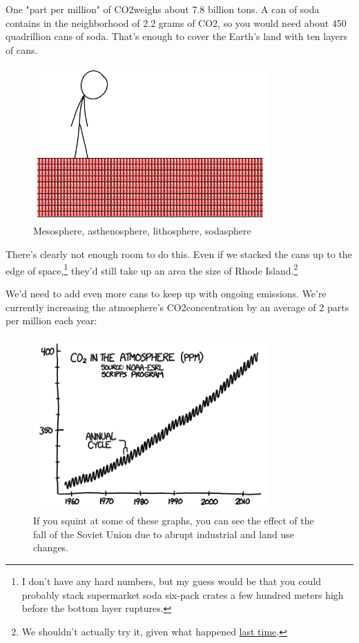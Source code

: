 {{One "part per million" of CO2weighs about 7.8 billion tons. A can of soda contains in the neighborhood of 2.2 grams of CO2, so you would need about 450 quadrillion cans of soda. That's enough to cover the Earth's land with ten layers of cans.}

\begin{figure}[!htbp]
\centering
\includegraphics[scale=0.5, max width=0.8\textwidth]{imgs/a/88/soda_layers.png}
\caption{Mesosphere, asthenosphere, lithosphere, sodasphere}
\end{figure}

{There's clearly not enough room to do this. Even if we stacked the cans up to the edge of space,{\footnote{I don't have any hard numbers, but my guess would be that you could probably stack supermarket soda six-pack crates a few hundred meters high before the bottom layer ruptures.} } they'd still take up an area the size of Rhode Island.{\footnote{We shouldn't actually try it, given what happened \href{http://what-if.xkcd.com/8/}{last time}.} } }

{We'd need to add even more cans to keep up with ongoing emissions. We're currently increasing the atmosphere's CO2concentration by an average of 2 parts per million each year:}

\begin{figure}[!htbp]
\centering
\includegraphics[scale=0.5, max width=0.8\textwidth]{imgs/a/88/soda_graph.png}
\caption{If you squint at some of these graphs, you can see the effect of the fall of the Soviet Union due to abrupt industrial and land use changes.}
\end{figure}

}
